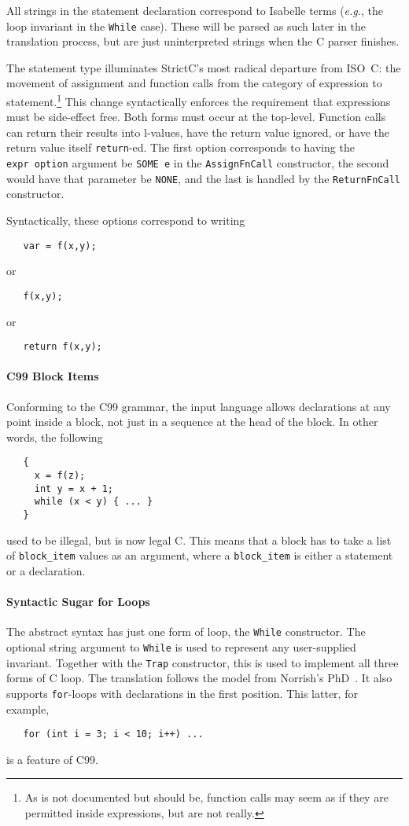\documentclass{article}
\newcommand{\strictc}{\textsf{StrictC}}
\newcommand{\eg}{\textit{e.g.}}
\begin{document}
All strings in the statement declaration correspond to Isabelle terms
(\eg, the loop invariant in the \texttt{While} case).
These will be parsed as such later in the translation
process, but are just uninterpreted strings when the C parser
finishes.

The statement type illuminates \strictc's most radical departure from
ISO~C: the movement of assignment and function calls from the category
of expression to statement.\footnote{As is not documented but should be, function calls may seem
  as if they are permitted inside expressions, but are not really.}
This change syntactically enforces the requirement that expressions must be
side-effect free.  Both forms must occur at the top-level.  Function
calls can return their results into l-values, have the return value
ignored, or have the return value itself \texttt{return}-ed.  The
first option corresponds to having the \texttt{expr~option} argument be
\texttt{SOME~e} in the \texttt{AssignFnCall} constructor, the second
would have that parameter be \texttt{NONE}, and the last is handled by
the \texttt{ReturnFnCall} constructor.

Syntactically, these options correspond to writing
\begin{verbatim}
   var = f(x,y);
\end{verbatim}
or
\begin{verbatim}
   f(x,y);
\end{verbatim}
or
\begin{verbatim}
   return f(x,y);
\end{verbatim}

\paragraph{C99 Block Items}
Conforming to the C99 grammar, the input language allows declarations
at any point inside a block, not just in a sequence at the head of the
block.  In other words, the following
\begin{verbatim}
   {
     x = f(z);
     int y = x + 1;
     while (x < y) { ... }
   }
\end{verbatim}
used to be illegal, but is now legal C.  This means that a block has
to take a list of \texttt{block_item} values as an argument, where a
\texttt{block_item} is either a statement or a declaration.

\paragraph{Syntactic Sugar for Loops}
The abstract syntax has just one form of loop, the \texttt{While}
constructor.  The optional string argument to \texttt{While} is used
to represent any user-supplied invariant.  Together with the
\texttt{Trap} constructor, this is used to implement all three forms
of C loop.  The translation follows the model from Norrish's
PhD~\cite[p60]{norrish98}.  It also supports \texttt{for}-loops with
declarations in the first position.  This latter, for example,
\begin{verbatim}
   for (int i = 3; i < 10; i++) ...
\end{verbatim}
is a feature of C99.
\end{document}
